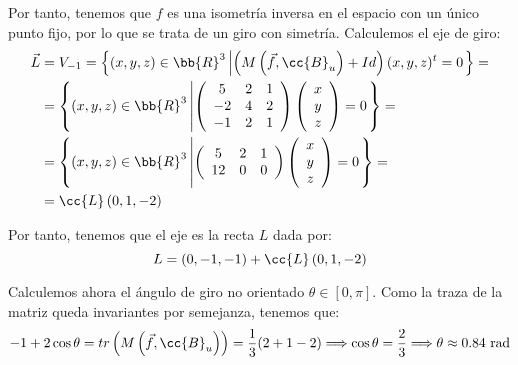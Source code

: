\begin{ejercicio}
    Por tanto, tenemos que $f$ es una isometría inversa en el espacio con un único punto fijo, por lo que se trata de un giro con simetría.
    Calculemos el eje de giro:
    \begin{align*}
        \vec{L} &= V_{-1} = \left\{(x,y,z)\in \bb{R}^3 \left|
            \left(M\left(\vec{f},\cc{B}_u\right) +Id\right)(x,y,z)^t = 0
        \right.\right\} =\\
        &= \left\{(x,y,z)\in \bb{R}^3 \left|
            \left(
            \begin{array}{ccc}
                5 & 2 & 1 \\
                -2 & 4 & 2 \\
                -1 & 2 & 1
            \end{array}
            \right)
            \left(
            \begin{array}{c}
                x \\ y \\ z
            \end{array}
            \right)
            = 0
        \right.\right\} =\\
        &= \left\{(x,y,z)\in \bb{R}^3 \left|
            \left(
            \begin{array}{ccc}
                5 & 2 & 1 \\
                12 & 0 & 0 \\
            \end{array}
            \right)
            \left(
            \begin{array}{c}
                x \\ y \\ z
            \end{array}
            \right)
            = 0
        \right.\right\} =\\
        &= \cc{L}\left(0, 1, -2\right)
    \end{align*}

    Por tanto, tenemos que el eje es la recta $L$ dada por:
    \begin{equation*}
        L = (0,-1,-1) + \cc{L}\left(0, 1, -2\right)
    \end{equation*}

    Calculemos ahora el ángulo de giro no orientado $\theta \in [0, \pi]$. Como la traza de la matriz queda invariantes por semejanza, tenemos que:
    \begin{equation*}
        -1+2\cos\theta = tr\left(M\left(\vec{f}, \cc{B}_u\right)\right) = \frac{1}{3}(2+1-2) \Longrightarrow \cos\theta = \frac{2}{3} \Longrightarrow \theta \approx 0.84 \text{ rad}
    \end{equation*}
\end{ejercicio}

